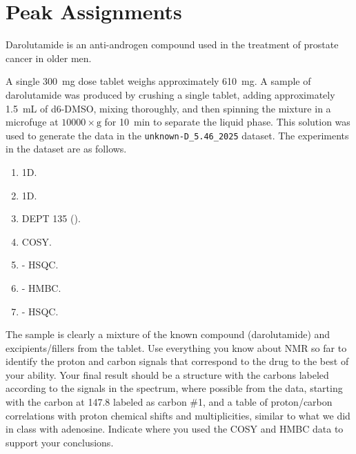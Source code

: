 \documentclass[../psets.tex]{subfiles}
\begin{document}
\section{Peak Assignments}
Darolutamide is an anti-androgen compound used in the treatment of prostate cancer in older men.
\begin{center}
    \footnotesize
\end{center}
A single \SI{300}{\milli\gram} dose tablet weighs approximately \SI{610}{\milli\gram}. A sample of darolutamide was produced by crushing a single tablet, adding approximately \SI{1.5}{\milli\liter} of d6-DMSO, mixing thoroughly, and then spinning the mixture in a microfuge at $\num{10000}\times\text{g}$ for \SI{10}{\minute} to separate the liquid phase. This solution was used to generate the data in the \verb|unknown-D_5.46_2025| dataset. The experiments in the dataset are as follows.
\begin{enumerate}
    \item {} 1D.
    \item {} 1D.
    \item DEPT 135 ().
    \item {} COSY.
    \item {}- HSQC.
    \item {}- HMBC.
    \item {}- HSQC.
\end{enumerate}
The sample is clearly a mixture of the known compound (darolutamide) and excipients/fillers from the tablet. Use everything you know about NMR so far to identify the proton and carbon signals that correspond to the drug to the best of your ability. Your final result should be a structure with the carbons labeled according to the  signals in the spectrum, where possible from the data, starting with the carbon at \SI{147.8}{\partspermillion} labeled as carbon \#1, and a table of proton/carbon correlations with proton chemical shifts and multiplicities, similar to what we did in class with adenosine. Indicate where you used the COSY and HMBC data to support your conclusions.
\end{document}

